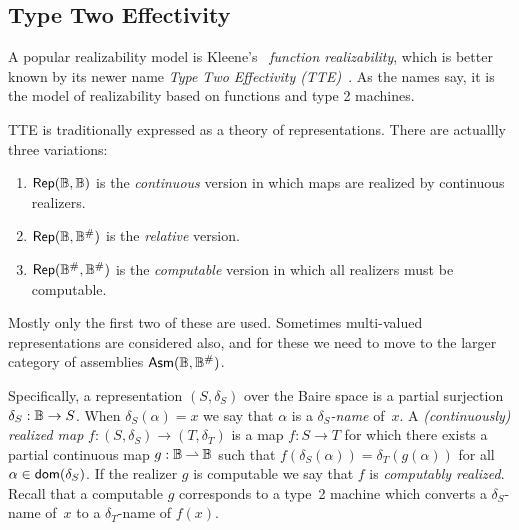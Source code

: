 \subsection{Type Two Effectivity}
\label{sec:tte}

A popular realizability model is Kleene's~\cite{KV65} \emph{function
  realizability}, which is better known by its newer name \emph{Type
  Two Effectivity (TTE)}~\cite{Wei00}. As the names say, it is the
model of realizability based on functions and type 2 machines. 

TTE is traditionally expressed as a theory of representations. There
are actuallly three variations:
%
\begin{enumerate}
\item $\mathsf{Rep}(\mathbb{B}, \mathbb{B})$ is the \emph{continuous} version in which
  maps are realized by continuous realizers.
\item $\mathsf{Rep}(\mathbb{B}, \mathbb{B}^{\#})$ is the \emph{relative} version.
\item $\mathsf{Rep}(\mathbb{B}^{\#}, \mathbb{B}^{\#})$ is the \emph{computable}
  version in which all realizers must be computable.
\end{enumerate}
%
Mostly only the first two of these are used. Sometimes multi-valued
representations are considered also, and for these we need to move to
the larger category of assemblies $\mathsf{Asm}(\mathbb{B}, \mathbb{B}^{\#})$.

Specifically, a representation $(S, \delta_S)$ over the Baire space is
a partial surjection $\delta_S : \mathbb{B} \to S$. When $\delta_S(\alpha)
= x$ we say that $\alpha$ is a \emph{$\delta_S$-name} of~$x$. A
\emph{(continuously) realized map} $f :(S, \delta_S) \to (T,
\delta_T)$ is a map $f : S \to T$ for which there exists a partial
continuous map $g : \mathbb{B} \mathbin{\rightharpoonup} \mathbb{B}$ such that
$f(\delta_S(\alpha)) = \delta_T(g(\alpha))$ for all $\alpha \in
\mathsf{dom}(\delta_S)$. If the realizer $g$ is computable we say that $f$ is
\emph{computably realized}. Recall that a computable $g$ corresponds
to a type~2 machine which converts a $\delta_S$-name of~$x$ to a
$\delta_T$-name of $f(x)$.

